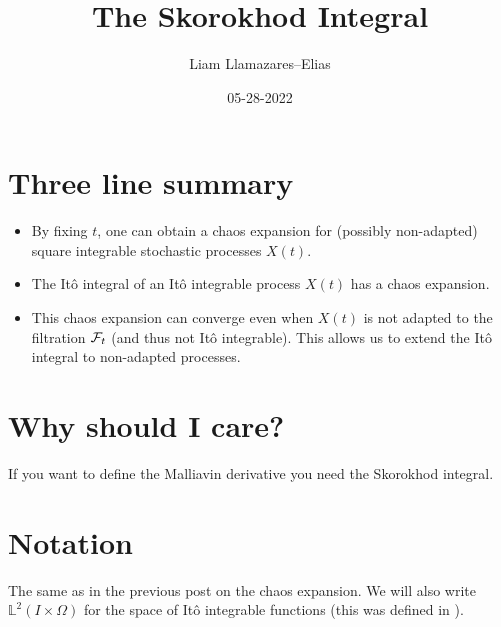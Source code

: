 \documentclass[12pt]{article}
\begin{document}
\title{The Skorokhod Integral}
\author{Liam Llamazares--Elias}
\date{05-28-2022}
\maketitle
\section{ Three line summary}
\begin{itemize}
	\item By fixing $t$, one can obtain a chaos expansion for (possibly non-adapted) square integrable stochastic processes $X(t)$.
	\item The Itô integral of an Itô integrable process $X(t)$ has a chaos expansion.
	\item This chaos expansion can converge even when $X(t)$ is not adapted to the filtration $\mathcal{F}_t$ (and thus not Itô integrable). This allows us to extend the Itô integral to non-adapted processes.
\end{itemize}
\section{Why should I care?}
If you want to define the Malliavin derivative you need the Skorokhod integral.
\section{Notation}
The same as in the previous post \cite{Chaosblog} on the chaos expansion. We will also write $\mathbb{L}^2(I\times \Omega)$ for the space of Itô integrable functions (this was defined in \cite{Itointblog}).
\end{document}
